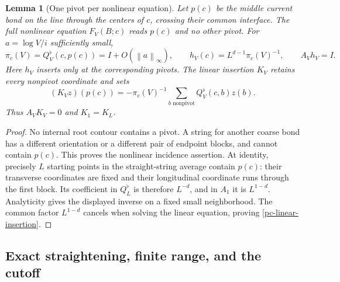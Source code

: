 \documentclass[11pt]{article}
\newtheorem{lemma}[theorem]{Lemma}
\theoremstyle{remark}
\newcommand{\norm}[1]{\left\|#1\right\|}
\begin{document}
\begin{lemma}[One pivot per nonlinear equation]\label{pc-pivot-lemma}
Let $p(c)$ be the middle current bond on the line through the
centers of $c$, crossing their common interface. The full
nonlinear equation $F_V(B;c)$ reads $p(c)$ and no other pivot.
For $a=\log V/i$ sufficiently small,
\begin{equation}\label{pc-pivot-inverse}
 \pi_c(V)=Q_V^\flat(c,p(c))=I+O(\norm a_\infty),\qquad
 h_V(c)=L^{d-1}\pi_c(V)^{-1},\qquad A_Vh_V=I.
\end{equation}
Here $h_V$ inserts only at the corresponding pivots. The linear
insertion $K_V$ retains every nonpivot coordinate and sets
\begin{equation}\label{pc-linear-insertion}
 (K_Vz)(p(c))=-\pi_c(V)^{-1}
       \sum_{b\text{ nonpivot}}Q_V^\flat(c,b)z(b).
\end{equation}
Thus $A_VK_V=0$ and $K_1=K_L$.
\end{lemma}

\begin{proof}
No internal root contour contains a pivot. A string for another
coarse bond has a different orientation or a different pair of
endpoint blocks, and cannot contain $p(c)$. This proves the
nonlinear incidence assertion. At identity, precisely $L$
starting points in the straight-string average contain $p(c)$:
their transverse coordinates are fixed and their longitudinal
coordinate runs through the first block. Its coefficient in
$Q_L^\flat$ is therefore $L^{-d}$, and in $A_1$ it is
$L^{1-d}$. Analyticity gives the displayed inverse on a fixed
small neighborhood. The common factor $L^{1-d}$ cancels when
solving the linear equation, proving
\eqref{pc-linear-insertion}.
\end{proof}

\subsection{Exact straightening, finite range, and the cutoff}
\label{pc-chart-section}
\end{document}
